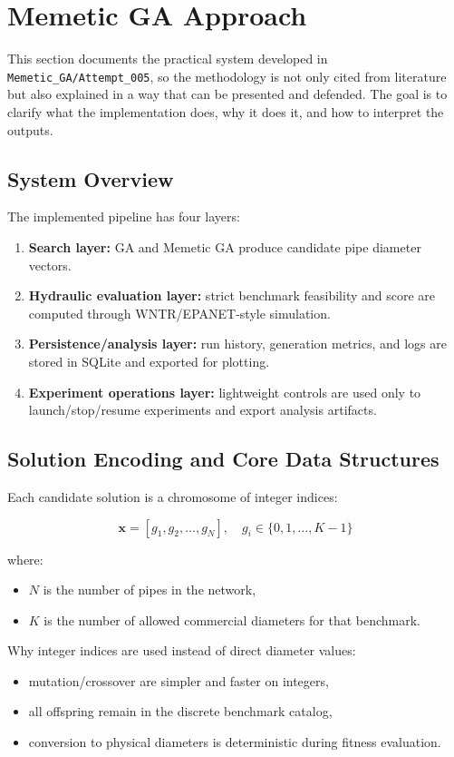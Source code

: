 \documentclass[12pt, a4paper]{article}
\begin{document}
\section{Memetic GA Approach}

This section documents the practical system developed in \texttt{Memetic\_GA/Attempt\_005}, so the methodology is not only cited from literature but also explained in a way that can be presented and defended. The goal is to clarify what the implementation does, why it does it, and how to interpret the outputs.

\subsection{System Overview}

The implemented pipeline has four layers:

\begin{enumerate}
	\item \textbf{Search layer:} GA and Memetic GA produce candidate pipe diameter vectors.
	\item \textbf{Hydraulic evaluation layer:} strict benchmark feasibility and score are computed through WNTR/EPANET-style simulation.
	\item \textbf{Persistence/analysis layer:} run history, generation metrics, and logs are stored in SQLite and exported for plotting.
	\item \textbf{Experiment operations layer:} lightweight controls are used only to launch/stop/resume experiments and export analysis artifacts.
\end{enumerate}

\subsection{Solution Encoding and Core Data Structures}

Each candidate solution is a chromosome of integer indices:

\[
	\mathbf{x} = [g_1, g_2, \dots, g_N], \quad g_i \in \{0,1,\dots,K-1\}
\]

where:
\begin{itemize}
	\item $N$ is the number of pipes in the network,
	\item $K$ is the number of allowed commercial diameters for that benchmark.
\end{itemize}

Why integer indices are used instead of direct diameter values:
\begin{itemize}
	\item mutation/crossover are simpler and faster on integers,
	\item all offspring remain in the discrete benchmark catalog,
	\item conversion to physical diameters is deterministic during fitness evaluation.
\end{itemize}
\end{document}
